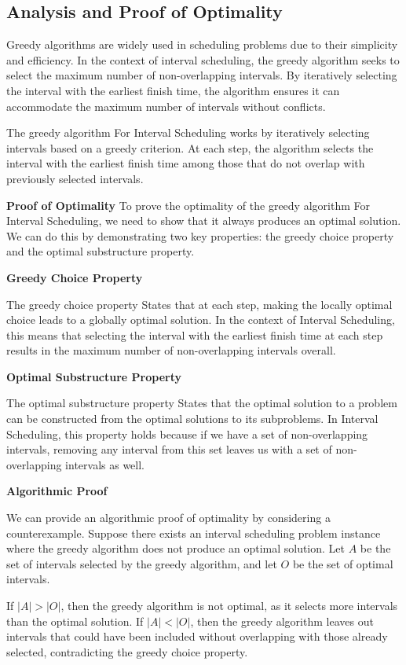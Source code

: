 \documentclass[12pt]{book} %
\begin{document}
\subsection{Analysis and Proof of Optimality}
Greedy algorithms are widely used in scheduling problems due to their simplicity and efficiency. In the context of interval scheduling, the greedy algorithm seeks to select the maximum number of non-overlapping intervals. By iteratively selecting the interval with the earliest finish time, the algorithm ensures it can accommodate the maximum number of intervals without conflicts.


The greedy algorithm For Interval Scheduling works by iteratively selecting intervals based on a greedy criterion. At each step, the algorithm selects the interval with the earliest finish time among those that do not overlap with previously selected intervals.

\textbf{Proof of Optimality}
\FloatBarrier
To prove the optimality of the greedy algorithm For Interval Scheduling, we need to show that it always produces an optimal solution. We can do this by demonstrating two key properties: the greedy choice property and the optimal substructure property.

\textbf{Greedy Choice Property}

The greedy choice property States that at each step, making the locally optimal choice leads to a globally optimal solution. In the context of Interval Scheduling, this means that selecting the interval with the earliest finish time at each step results in the maximum number of non-overlapping intervals overall.

\textbf{Optimal Substructure Property}

The optimal substructure property States that the optimal solution to a problem can be constructed from the optimal solutions to its subproblems. In Interval Scheduling, this property holds because if we have a set of non-overlapping intervals, removing any interval from this set leaves us with a set of non-overlapping intervals as well.

\textbf{Algorithmic Proof}

We can provide an algorithmic proof of optimality by considering a counterexample. Suppose there exists an interval scheduling problem instance where the greedy algorithm does not produce an optimal solution. Let \( A \) be the set of intervals selected by the greedy algorithm, and let \( O \) be the set of optimal intervals.

If \( |A| > |O| \), then the greedy algorithm is not optimal, as it selects more intervals than the optimal solution. If \( |A| < |O| \), then the greedy algorithm leaves out intervals that could have been included without overlapping with those already selected, contradicting the greedy choice property.
\end{document}

